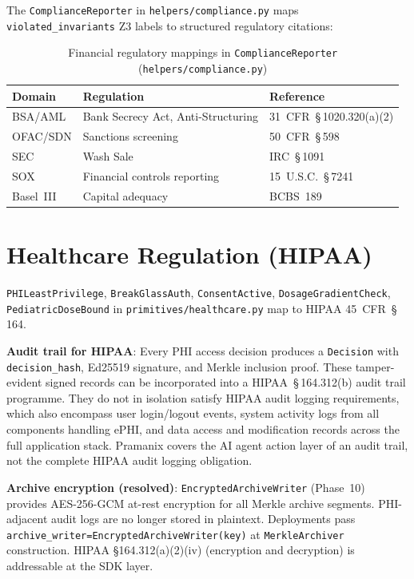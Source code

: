 \documentclass[12pt,a4paper,oneside]{report}
\newcommand{\fname}[1]{\texttt{#1}}          %
\newcommand{\code}[1]{\texttt{#1}}           %
\begin{document}
The \code{ComplianceReporter} in \fname{helpers/compliance.py} maps
\code{violated\_invariants} Z3 labels to structured regulatory citations:

\begin{table}[h]
\centering\small
\begin{tabular}{@{} l l l @{}}
\toprule
\textbf{Domain} & \textbf{Regulation} & \textbf{Reference} \\
\midrule
BSA/AML   & Bank Secrecy Act, Anti-Structuring & 31~CFR~\S\,1020.320(a)(2) \\
OFAC/SDN  & Sanctions screening                & 50~CFR~\S\,598 \\
SEC       & Wash Sale                          & IRC~\S\,1091 \\
SOX       & Financial controls reporting       & 15~U.S.C.~\S\,7241 \\
Basel~III & Capital adequacy                   & BCBS~189 \\
\bottomrule
\end{tabular}
\caption{Financial regulatory mappings in \code{ComplianceReporter}
  (\fname{helpers/compliance.py})}
\end{table}

\section{Healthcare Regulation (HIPAA)}

\code{PHILeastPrivilege}, \code{BreakGlassAuth}, \code{ConsentActive},
\code{DosageGradientCheck}, \code{PediatricDoseBound} in
\fname{primitives/healthcare.py} map to HIPAA 45~CFR~\S\,164.

\textbf{Audit trail for HIPAA}: Every PHI access decision produces a
\code{Decision} with \code{decision\_hash}, Ed25519 signature, and Merkle
inclusion proof.  These tamper-evident signed records can be incorporated
into a HIPAA~\S\,164.312(b) audit trail programme.  They do not in isolation
satisfy HIPAA audit logging requirements, which also encompass user
login/logout events, system activity logs from all components handling ePHI,
and data access and modification records across the full application stack.
Pramanix covers the AI agent action layer of an audit trail, not the complete
HIPAA audit logging obligation.

\textbf{Archive encryption (resolved)}: \code{EncryptedArchiveWriter}
(Phase~10) provides AES-256-GCM at-rest encryption for all Merkle archive
segments.  PHI-adjacent audit logs are no longer stored in plaintext.
Deployments pass \code{archive\_writer=EncryptedArchiveWriter(key)} at
\code{MerkleArchiver} construction.  HIPAA \S164.312(a)(2)(iv) (encryption
and decryption) is addressable at the SDK layer.
\end{document}
